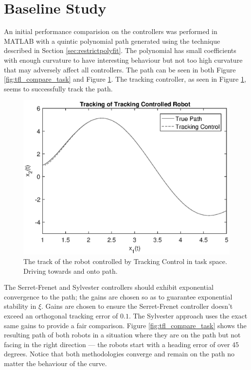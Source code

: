 \documentclass[oneside, 11pt]{book}
\begin{document}
\section{Baseline Study}
An initial performance comparision on the controllers was performed in MATLAB with a quintic polynomial path generated using the technique described in Section \ref{sec:restrictpolyfit}. The polynomial has small coefficients with enough curvature to have interesting behaviour but not too high curvature that may adversely affect all controllers. The path can be seen in both Figure \ref{fig:tfl_compare_task} and Figure \ref{fig:track}. The tracking controller, as seen in Figure \ref{fig:track}, seems to successfully track the path.
\begin{figure}[H]
    \centering
    \includegraphics{images/tracking_control.eps}
    \caption{The track of the robot controlled by Tracking Control in task space. Driving towards and onto path.}
    \label{fig:track}
\end{figure}

The Serret-Frenet and Sylvester controllers should exhibit exponential convergence to the path; the gains are chosen so as to guarantee exponential stability in $\xi$. Gains are chosen to ensure the Serret-Frenet controller doesn't exceed an orthogonal tracking error of $0.1$. The Sylvester approach uses the exact same gains to provide a fair comparison. Figure \ref{fig:tfl_compare_task} shows the resulting path of both robots in a situation where they are on the path but not facing in the right direction --- the robots start with a heading error of over 45 degrees. Notice that both methodologies converge and remain on the path no matter the behaviour of the curve.
\end{document}
